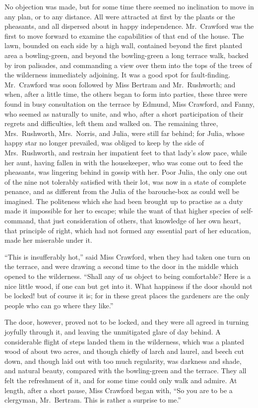 No objection was made, but for some time there seemed
no inclination to move in any plan, or to any distance.
All were attracted at first by the plants or the pheasants,
and all dispersed about in happy independence.
Mr.\ Crawford was the first to move forward to examine
the capabilities of that end of the house.  The lawn,
bounded on each side by a high wall, contained beyond
the first planted area a bowling-green, and beyond
the bowling-green a long terrace walk, backed by iron
palisades, and commanding a view over them into the tops
of the trees of the wilderness immediately adjoining.
It was a good spot for fault-finding. Mr.\ Crawford was soon
followed by Miss Bertram and Mr.\ Rushworth; and when,
after a little time, the others began to form into parties,
these three were found in busy consultation on the terrace
by Edmund, Miss Crawford, and Fanny, who seemed as naturally
to unite, and who, after a short participation of their
regrets and difficulties, left them and walked on.
The remaining three, Mrs.\ Rushworth, Mrs.\ Norris,
and Julia, were still far behind; for Julia, whose happy
star no longer prevailed, was obliged to keep by the side
of Mrs.\ Rushworth, and restrain her impatient feet to that
lady's slow pace, while her aunt, having fallen in with
the housekeeper, who was come out to feed the pheasants,
was lingering behind in gossip with her.  Poor Julia,
the only one out of the nine not tolerably satisfied
with their lot, was now in a state of complete penance,
and as different from the Julia of the barouche-box
as could well be imagined.  The politeness which she had
been brought up to practise as a duty made it impossible
for her to escape; while the want of that higher species
of self-command, that just consideration of others,
that knowledge of her own heart, that principle of right,
which had not formed any essential part of her education,
made her miserable under it.

``This is insufferably hot,'' said Miss Crawford, when they
had taken one turn on the terrace, and were drawing
a second time to the door in the middle which opened to
the wilderness.  ``Shall any of us object to being comfortable?
Here is a nice little wood, if one can but get into it.
What happiness if the door should not be locked! but of
course it is; for in these great places the gardeners
are the only people who can go where they like.''

The door, however, proved not to be locked, and they were
all agreed in turning joyfully through it, and leaving
the unmitigated glare of day behind.  A considerable
flight of steps landed them in the wilderness, which was
a planted wood of about two acres, and though chiefly
of larch and laurel, and beech cut down, and though laid
out with too much regularity, was darkness and shade,
and natural beauty, compared with the bowling-green
and the terrace.  They all felt the refreshment of it,
and for some time could only walk and admire.  At length,
after a short pause, Miss Crawford began with, ``So you
are to be a clergyman, Mr.\ Bertram.  This is rather
a surprise to me.''


